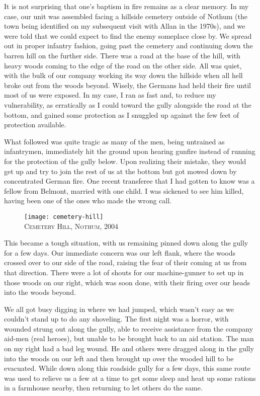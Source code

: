 \documentclass[../m3y]{subfiles}
\begin{document}
It is not surprising that one's baptism in fire remains as a clear memory. In my case, our unit was assembled facing a hillside cemetery outside of Nothum (the town being identified on my subsequent visit with Allan in the 1970s), and we were told that we could expect to find the enemy someplace close by. We spread out in proper infantry fashion, going past the cemetery and continuing down the barren hill on the further side. There was a road at the base of the hill, with heavy woods coming to the edge of the road on the other side. All was quiet, with the bulk of our company working its way down the hillside when all hell broke out from the woods beyond. Wisely, the Germans had held their fire until most of us were exposed. In my case, I ran as fast and, to reduce my vulnerability, as erratically as I could toward the gully alongside the road at the bottom, and gained some protection as I snuggled up against the few feet of protection available.

What followed was quite tragic as many of the men, being untrained as infantrymen, immediately hit the ground upon hearing gunfire instead of running for the protection of the gully below. Upon realizing their mistake, they would get up and try to join the rest of us at the bottom but got mowed down by concentrated German fire. One recent transferee that I had gotten to know was a fellow from Belmont, married with one child. I was sickened to see him killed, having been one of the ones who made the wrong call.

\begin{figure}[h]
\centering
\texttt{[image: cemetery-hill]}\\
\medskip
{\newtimes\textsc{Cemetery Hill, Nothum, 2004}}
\end{figure}

This became a tough situation, with us remaining pinned down along the gully for a few days. Our immediate concern was our left flank, where the woods crossed over to our side of the road, raising the fear of their coming at us from that direction. There were a lot of shouts for our machine-gunner to set up in those woods on our right, which was soon done, with their firing over our heads into the woods beyond.

We all got busy digging in where we had jumped, which wasn't easy as we couldn't stand up to do any shoveling. The first night was a horror, with wounded strung out along the gully, able to receive assistance from the company aid-men (real heroes), but unable to be brought back to an aid station. The man on my right had a bad leg wound. He and others were dragged along in the gully into the woods on our left and then brought up over the wooded hill to be evacuated. While down along this roadside gully for a few days, this same route was used to relieve us a few at a time to get some sleep and heat up some rations in a farmhouse nearby, then returning to let others do the same.
\end{document}
